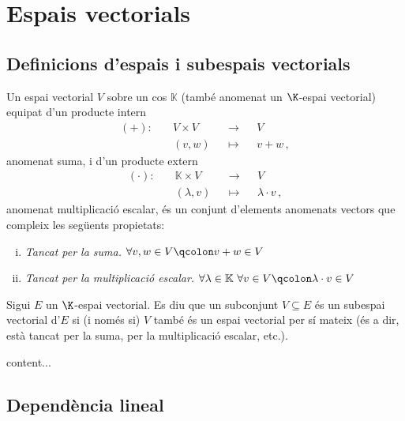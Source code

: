 \chapter{Espais vectorials}
\section{Definicions d'espais i subespais vectorials}
\begin{defi}
	Un espai vectorial $V$ sobre un cos $\mathbb{K}$ (també anomenat un $\K$-espai vectorial) equipat d'un producte intern
	\begin{equation*}
	\begin{aligned}
		(+)\colon\quad	&V\times V &&\rightarrow&& V\\
						&(v,w) &&\mapsto&& v+w \,,
	\end{aligned}
	\end{equation*}
	anomenat suma, i d'un producte extern
	\begin{equation*}
	\begin{aligned}
		(\cdot)\colon\quad	&\mathbb{K}\times V &&\rightarrow&& V\\
							&(\lambda,v) &&\mapsto&& \lambda\cdot v\,,
	\end{aligned}
	\end{equation*} 
	anomenat multiplicació escalar, és un conjunt d'elements anomenats vectors que compleix les següents propietats:
	\begin{enumerate}[i)]
		\item \textit{Tancat per la suma.} $\forall v,w \in V\qcolon v+w\in V$
		\item \textit{Tancat per la multiplicació escalar.} $\forall \lambda \in \mathbb{K}\ \forall v \in V\qcolon \lambda\cdot v\in V$
	\end{enumerate}
\end{defi}

\begin{defi}
	Sigui $E$ un $\K$-espai vectorial. Es diu que un subconjunt $V\subseteq E$ és un subespai vectorial d'$E$ si (i només si) $V$ també és un espai vectorial per sí mateix (és a dir, està tancat per la suma, per la multiplicació escalar, etc.).
\end{defi}

\begin{prop}
	content...
\end{prop}

\section{Dependència lineal}

